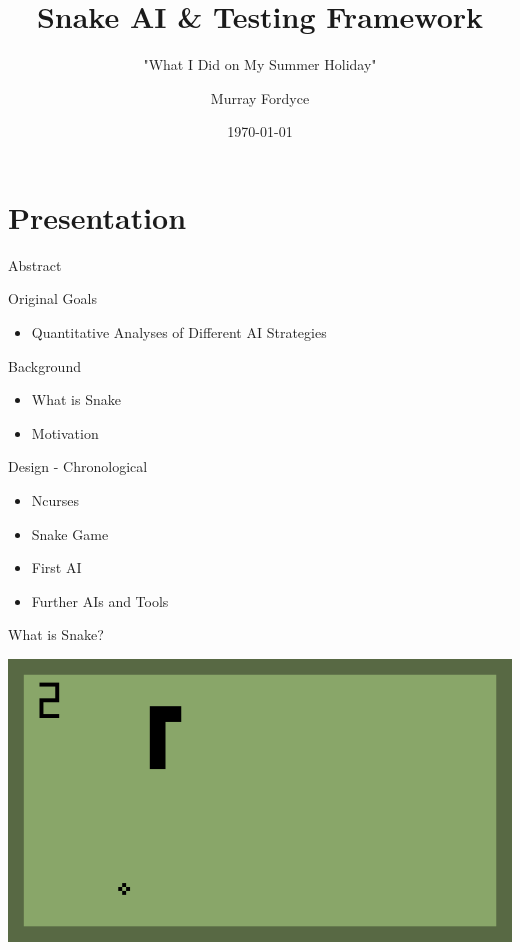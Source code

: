 \documentclass[presentation,bigger]{beamer}
\author{Murray Fordyce}
\date{\today}
\title{Snake AI \& Testing Framework}
\subtitle{"What I Did on My Summer Holiday"}
\begin{document}
\maketitle

\section{Presentation}
\label{sec:org9337e65}
\begin{frame}[label={sec:orgd1e2826}]{Abstract}
\begin{block}{Original Goals}
\begin{itemize}
\item Quantitative Analyses of Different AI Strategies
\end{itemize}
\end{block}
\begin{block}{Background}
\begin{itemize}
\item What is Snake
\item Motivation
\end{itemize}
\end{block}
\begin{block}{Design - Chronological}
\begin{itemize}
\item Ncurses
\item Snake Game
\item First AI
\item Further AIs and Tools
\end{itemize}
\end{block}
\end{frame}
\begin{frame}[label={sec:org7d5d798}]{What is Snake?}
\begin{center}
\includegraphics[width=.9\linewidth]{./snek-40.png}
\end{center}
\end{frame}
\end{document}
